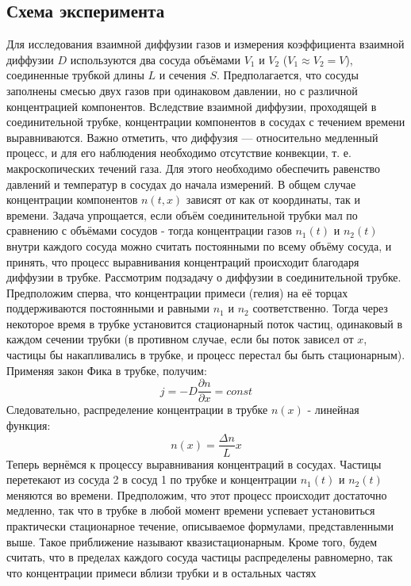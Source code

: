 	 \subsection*{Схема эксперимента}\n
	 Для исследования взаимной диффузии газов и
измерения коэффициента взаимной диффузии $D$ используются два сосуда
объёмами $V_1$ и $V_2$ ($V_1 \approx V_2 = V$), соединенные трубкой длины $L$ и сечения $S$. Предполагается, что сосуды заполнены смесью двух газов при одинаковом давлении, но с различной концентрацией компонентов. Вследствие взаимной диффузии, проходящей в соединительной трубке, концентрации компонентов в сосудах с течением времени выравниваются.\n\n
Важно отметить, что диффузия — относительно медленный процесс, и для его наблюдения необходимо отсутствие конвекции, т. е. макроскопических течений газа. Для этого необходимо обеспечить равенство давлений и температур в сосудах до начала измерений.\n\n
В общем случае концентрации компонентов $n \left (t, x \right )$
зависят от как от координаты, так и времени. Задача упрощается, если объём соединительной трубки мал по сравнению с объёмами сосудов - тогда концентрации газов $n_1 \left (t \right )$ и $n_2 \left (t \right )$ внутри каждого сосуда можно считать постоянными по всему объёму сосуда, и принять, что процесс выравнивания концентраций происходит благодаря диффузии в трубке.\n\n
Рассмотрим подзадачу о диффузии в соединительной трубке. Предположим сперва, что концентрации примеси (гелия) на её торцах поддерживаются постоянными и равными $n_1$ и $n_2$ соответственно. Тогда через некоторое время в трубке установится стационарный поток частиц, одинаковый в каждом сечении трубки (в противном случае, если бы поток зависел от $x$, частицы бы накапливались в трубке, и процесс перестал бы быть стационарным). Применяя закон Фика в трубке, получим:
	\[j = -D \frac{\partial n}{\partial x} = const\]
	Следовательно, распределение концентрации в трубке $n (x)$ - линейная функция:
	\[n(x) = \frac{\Delta n}{L} x\]
	Теперь вернёмся к процессу выравнивания концентраций в сосудах.
Частицы перетекают из сосуда 2 в сосуд 1 по трубке и концентрации $n_1(t)$ и $n_2(t)$ меняются во времени. Предположим, что этот процесс происходит достаточно медленно, так что в трубке в любой момент времени успевает установиться практически стационарное течение, описываемое формулами, представленными выше. Такое приближение называют квазистационарным. Кроме того, будем считать, что в пределах каждого сосуда частицы распределены равномерно, так что концентрации примеси вблизи трубки и в остальных частях
